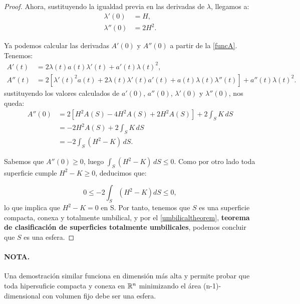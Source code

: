 \begin{proof}
Ahora, sustituyendo la igualdad previa en las derivadas de $\lambda$, llegamos a:
%
\begin{align*}
    \lambda'(0) &= H, \\
    \lambda''(0) &= 2H^2.
\end{align*}

Ya podemos calcular las derivadas $A'(0)$ y $A''(0)$ a partir de la \autoref{funcA}. Tenemos:
%
\begin{align*}
    A'(t) &= 2\lambda(t)a(t)\lambda'(t) + a'(t)\lambda(t)^2, \\
    A''(t) &= 2\left [ \lambda'(t)^2a(t) + 2\lambda(t)\lambda'(t)a'(t) + a(t)\lambda(t)\lambda''(t) \right] + a''(t)\lambda(t)^2.
\end{align*}
%
sustituyendo los valores calculados de $a'(0)$, $a''(0)$, $\lambda'(0)$ y $\lambda''(0)$, nos queda:
%
\begin{align*}
    A''(0) &= 2\left[ H^2A(S) -4H^2A(S) + 2H^2A(S) \right] + 2\int_S K \, dS \\
    &= -2H^2A(S) + 2\int_S K \, dS \\
    &= -2\int_S (H^2-K) \, dS.
\end{align*}

Sabemos que $A''(0) \geq 0$, luego $\int_S (H^2-K) \, dS \leq 0$. Como por otro lado toda superficie cumple $H^2-K \geq 0$, deducimos que:

\begin{equation*}
    0 \leq -2\int_S (H^2-K) dS \leq 0,
\end{equation*}
%
lo que implica que $H^2-K = 0$ en S. Por tanto, tenemos que $S$ es una superficie compacta, conexa y totalmente umbilical, y por el \autoref{umbilicaltheorem}, \textbf{teorema de clasificación de superficies totalmente umbilicales}, podemos concluir que $S$ es una esfera.
\end{proof}

\paragraph{NOTA.} Una demostración similar funciona en dimensión más alta y permite probar que toda hipersuficie compacta y conexa en $\mathbb{R}^n$ minimizando el área (n-1)-dimensional con volumen fijo debe ser una esfera.
